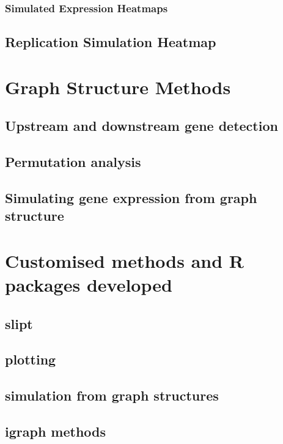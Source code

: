 \subsubsection{Simulated Expression Heatmaps}
\subsection{Replication Simulation Heatmap}
\section{Graph Structure Methods}
\subsection{Upstream and downstream gene detection}
\subsection{Permutation analysis}
\subsection{Simulating gene expression from graph structure}
\section{Customised methods and R packages developed}
\subsection{slipt}
\subsection{plotting}
\subsection{simulation from graph structures}
\subsection{igraph methods}


